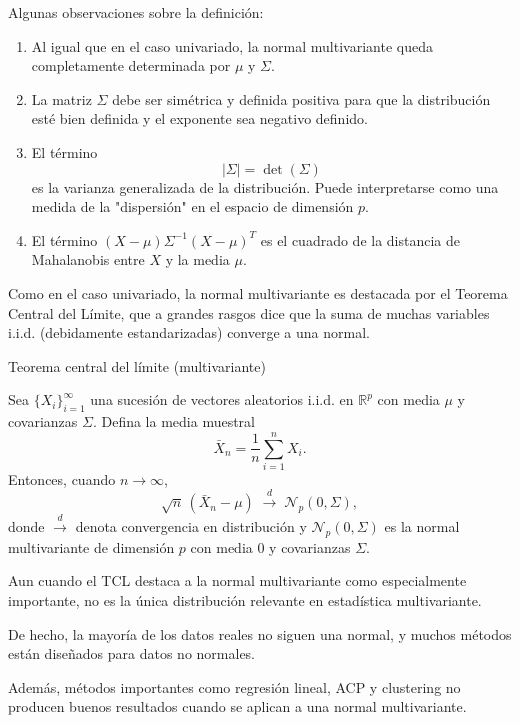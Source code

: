 \documentclass[
  11pt,
  ignorenonframetext,
  aspectratio=169]{beamer}
\theoremstyle{plain}
\theoremstyle{definition}
\theoremstyle{remark}
\begin{document}
\begin{frame}{}
\label{section-1}
\begin{remark} Algunas observaciones sobre la definición:
\begin{enumerate}
\item Al igual que en el caso univariado, la normal multivariante queda completamente determinada por $\mu$ y $\Sigma$. \pause
\item La matriz $\Sigma$ debe ser simétrica y definida positiva para que la distribución esté bien definida y el exponente sea negativo definido. \pause
\item El término 
$$
|\Sigma| = \det(\Sigma)
$$
es la \alert{varianza generalizada} de la distribución. Puede interpretarse como una medida de la "dispersión" en el espacio de dimensión $p$. \pause
\item El término $(X - \mu) \Sigma^{-1} (X - \mu)^{T}$ es el cuadrado de la distancia de Mahalanobis entre $X$ y la media $\mu$. 
\end{enumerate}
\end{remark}
\end{frame}

\begin{frame}{}
\label{section-2}
Como en el caso univariado, la normal multivariante es destacada por el
Teorema Central del Límite, que a grandes rasgos dice que la suma de
muchas variables i.i.d. (debidamente estandarizadas) converge a una
normal.
\end{frame}

\begin{frame}{Teorema central del límite (multivariante)}
\label{teorema-central-del-luxedmite-multivariante}
\begin{theorem}
Sea $\{X_i\}_{i=1}^{\infty}$ una sucesión de vectores aleatorios i.i.d. en $\mathbb{R}^p$ con media $\mu$ y covarianzas $\Sigma$. Defina la media muestral
\[
\bar{X}_n = \frac{1}{n}\sum_{i=1}^n X_i.
\]
Entonces, cuando $n \to \infty$,
\[
\sqrt{n}\,(\bar{X}_n - \mu) \;\xrightarrow{d}\; \mathcal{N}_p(0, \Sigma),
\]
donde $\xrightarrow{d}$ denota convergencia en distribución y $\mathcal{N}_p(0, \Sigma)$ es la normal multivariante de dimensión $p$ con media $0$ y covarianzas $\Sigma$.
\end{theorem}
\end{frame}

\begin{frame}{}
\label{section-3}
\begin{remark}
Aun cuando el TCL destaca a la normal multivariante como especialmente importante, no es la única distribución relevante en estadística multivariante.

\bigpause 

De hecho, la mayoría de los datos reales no siguen una normal, y muchos métodos están diseñados para datos no normales.

\bigpause

Además, métodos importantes como regresión lineal, ACP y clustering no producen buenos resultados cuando se aplican a una normal multivariante.
\end{remark}
\end{frame}
\end{document}
